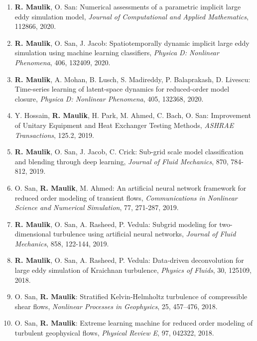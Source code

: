 \documentclass[letterpaper]{article}
\begin{document}
\begin{enumerate}
\item \textbf{R. Maulik}, O. San: Numerical assessments of a parametric implicit large eddy simulation model, {\it Journal of Computational and Applied Mathematics}, 112866, 2020.

\item \textbf{R. Maulik}, O. San, J. Jacob: Spatiotemporally dynamic implicit large eddy simulation using machine learning classifiers, {\it Physica D: Nonlinear Phenomena}, 406, 132409, 2020. 

\item \textbf{R. Maulik}, A. Mohan, B. Lusch, S. Madireddy, P. Balaprakash, D. Livescu: Time-series learning of latent-space dynamics for reduced-order model closure, {\it Physica D: Nonlinear Phenomena}, 405, 132368, 2020. 

\item Y. Hossain, \textbf{R. Maulik}, H. Park, M. Ahmed, C. Bach, O. San: Improvement of Unitary Equipment and Heat Exchanger Testing Methods, {\it ASHRAE Transactions}, 125.2, 2019. 

\item \textbf{R. Maulik}, O. San, J. Jacob, C. Crick: Sub-grid scale model classification and blending through deep learning, {\it Journal of Fluid Mechanics}, 870, 784-812, 2019. 

\item O. San, \textbf{R. Maulik}, M. Ahmed: An artificial neural network framework for reduced order modeling of transient flows, {\it Communications in Nonlinear Science and Numerical Simulation}, 77, 271-287, 2019. 

\item \textbf{R. Maulik}, O. San, A. Rasheed, P. Vedula: Subgrid modeling for two-dimensional turbulence using artificial neural networks, {\it Journal of Fluid Mechanics}, 858, 122-144, 2019. 

\item \textbf{R. Maulik}, O. San, A. Rasheed, P. Vedula: Data-driven deconvolution for large eddy simulation of Kraichnan turbulence, {\it Physics of Fluids}, 30, 125109, 2018. 

\item O. San, \textbf{R. Maulik}: Stratified Kelvin-Helmholtz turbulence of compressible shear flows, {\it Nonlinear Processes in Geophysics}, 25, 457--476, 2018.

\item O. San, \textbf{R. Maulik}: Extreme learning machine for reduced order modeling of turbulent geophysical flows, {\it Physical Review E}, 97, 042322, 2018. 


\end{enumerate}
\end{document}
